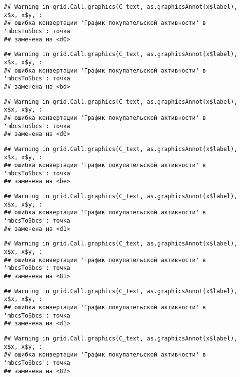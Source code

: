 \documentclass[
]{article}
\begin{document}
\begin{verbatim}
## Warning in grid.Call.graphics(C_text, as.graphicsAnnot(x$label), x$x, x$y, :
## ошибка конвертации 'График покупательской активности' в 'mbcsToSbcs': точка
## заменена на <d0>
\end{verbatim}

\begin{verbatim}
## Warning in grid.Call.graphics(C_text, as.graphicsAnnot(x$label), x$x, x$y, :
## ошибка конвертации 'График покупательской активности' в 'mbcsToSbcs': точка
## заменена на <bd>
\end{verbatim}

\begin{verbatim}
## Warning in grid.Call.graphics(C_text, as.graphicsAnnot(x$label), x$x, x$y, :
## ошибка конвертации 'График покупательской активности' в 'mbcsToSbcs': точка
## заменена на <d0>
\end{verbatim}

\begin{verbatim}
## Warning in grid.Call.graphics(C_text, as.graphicsAnnot(x$label), x$x, x$y, :
## ошибка конвертации 'График покупательской активности' в 'mbcsToSbcs': точка
## заменена на <be>
\end{verbatim}

\begin{verbatim}
## Warning in grid.Call.graphics(C_text, as.graphicsAnnot(x$label), x$x, x$y, :
## ошибка конвертации 'График покупательской активности' в 'mbcsToSbcs': точка
## заменена на <d1>
\end{verbatim}

\begin{verbatim}
## Warning in grid.Call.graphics(C_text, as.graphicsAnnot(x$label), x$x, x$y, :
## ошибка конвертации 'График покупательской активности' в 'mbcsToSbcs': точка
## заменена на <81>
\end{verbatim}

\begin{verbatim}
## Warning in grid.Call.graphics(C_text, as.graphicsAnnot(x$label), x$x, x$y, :
## ошибка конвертации 'График покупательской активности' в 'mbcsToSbcs': точка
## заменена на <d1>
\end{verbatim}

\begin{verbatim}
## Warning in grid.Call.graphics(C_text, as.graphicsAnnot(x$label), x$x, x$y, :
## ошибка конвертации 'График покупательской активности' в 'mbcsToSbcs': точка
## заменена на <82>
\end{verbatim}
\end{document}
